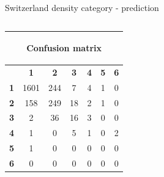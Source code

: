 \documentclass[c]{beamer}
\begin{document}
\begin{frame}
\begin{columns}
\begin{column}{0.5\textwidth}
\begin{overlayarea}{\linewidth}{4cm}
  \end{overlayarea}
  \begin{overlayarea}{\linewidth}{0.5cm}
    \centering
    \tiny Switzerland density category - prediction\par
  \end{overlayarea}
 \end{column}
\end{columns}
\begin{columns}
 \begin{column}{0.6\textwidth}
 \begin{overlayarea}{\linewidth}{2cm}
  \begin{table}
  \begin{center}
  \begin{adjustbox}{max width=0.6\textwidth}
  {\tiny
  \begin{tabular}{|c|c|c|c|c|c|c|}
    \hline
    \multicolumn{7}{|c|}{{\tiny \begin{bf}Confusion matrix\end{bf}}} \\
    \hline
     & \textbf{1} & \textbf{2} & \textbf{3} & \textbf{4} & \textbf{5} & \textbf{6}\\
    \hline
    \textbf{1} & 1601 & 244 & 7 & 4 & 1 & 0\\
    \hline
    \textbf{2} & 158 & 249 & 18 & 2 & 1 & 0\\
    \hline
    \textbf{3} & 2 & 36 & 16 & 3 & 0 & 0\\
    \hline
    \textbf{4} & 1 & 0 & 5 & 1 & 0 & 2\\
    \hline
    \textbf{5} & 1 & 0 & 0 & 0 & 0 & 0\\
    \hline
    \textbf{6} & 0 & 0 & 0 & 0 & 0 & 0\\
    \hline
  \end{tabular}
  }
  \end{adjustbox}
  \end{center}
  \end{table}
 \end{overlayarea}
 \end{column}
 \begin{column}{0.6\textwidth}

\end{column}
\end{columns}
\end{frame}
\end{document}
